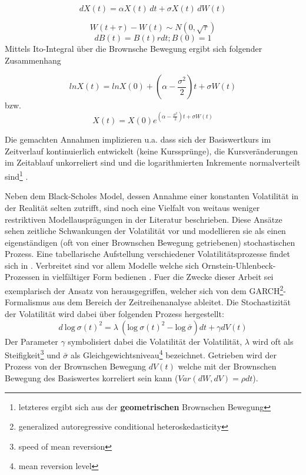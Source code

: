 \documentclass[12pt,a4paper,headsepline,bibliography=totoc,listof=totoc,headinclude=false,footinclude=false,BCOR5mm]{scrreprt} %
\begin{document}
  \begin{equation} \label{underlying}
dX(t) =  \alpha X(t) \, dt +  \sigma X(t) \, dW(t) \end{equation}

  \begin{equation} \label{underlying1}
W(t+\tau) - W(t) \sim N(0, \sqrt{\tau}) \end{equation}
  \begin{equation} \label{bond1}
dB(t) = B(t)r dt; B(0)=1 \end{equation}
Mittels Ito-Integral \"uber die Brownsche Bewegung ergibt sich folgender Zusammenhang \cite[S.146]{Lin2006}

  \begin{equation} \label{underlying2}
ln X(t) = ln X(0) + (\alpha - \frac{\sigma^{2}}{2})t + \sigma W(t) \end{equation}
bzw.
  \begin{equation} \label{underlying3}
X(t) =  X(0) e^{(\alpha - \frac{\sigma^{2}}{2})t + \sigma W(t)} \end{equation}

Die gemachten Annahmen implizieren u.a. dass sich der Basiswertkurs im Zeitverlauf kontinuierlich entwickelt (keine Kursspr\"unge), die Kursver\"anderungen im Zeitablauf unkorreliert sind und die logarithmierten Inkremente normalverteilt sind\footnote{letzteres ergibt sich aus der {\bf geometrischen} Brownschen Bewegung} \cite[S.4]{Zimmermann2000}\cite{Osborne59}. 

Neben dem Black-Scholes Model, dessen Annahme einer konstanten Volatilit\"at in der Realit\"at selten zutrifft,  sind noch eine Vielfalt von weitaus weniger restriktiven Modellauspr\"agungen in der Literatur beschrieben. Diese Ans\"atze sehen zeitliche Schwankungen der Volatilit\"at vor und modellieren sie als einen eigenst\"andigen (oft von einer Brownschen Bewegung getriebenen) stochastischen Prozess.
Eine tabellarische Aufstellung verschiedener Volatilit\"atsprozesse findet sich in \cite[S. 212]{Singer1999}.  Verbreitet sind vor allem Modelle welche sich Ornstein-Uhlenbeck-Prozessen in vielf\"altiger Form bedienen \cite{Javaheri2002}. Fuer die Zwecke dieser Arbeit sei exemplarisch der Ansatz von \cite{Nelson1992} herausgegriffen, welcher sich von dem GARCH\footnote{generalized autoregressive conditional heteroskedasticity}-Formalismus aus dem Bereich der Zeitreihenanalyse ableitet. Die Stochastizit\"at der Volatilit\"at wird dabei \"uber folgenden Prozess hergestellt:
 \begin{equation} \label{vola}
d \ \text{log} \ \sigma(t)^2 =\lambda \ ( \text{log} \ \sigma(t)^2 - \text{log} \ \bar{\sigma})dt + \gamma dV(t)
\end{equation}
Der Parameter $\gamma$ symbolisiert dabei die Volatilit\"at der Volatilit\"at, $\lambda$ wird oft als Steifigkeit\footnote{speed of mean reversion} und $ \bar{\sigma}$ als Gleichgewichtsniveau\footnote{mean reversion level} bezeichnet. Getrieben wird der Prozess von der Brownschen Bewegung $dV(t)$ welche mit der Brownschen Bewegung des Basiswertes korreliert sein kann ($Var(dW, dV) = \rho dt$).
\end{document}
